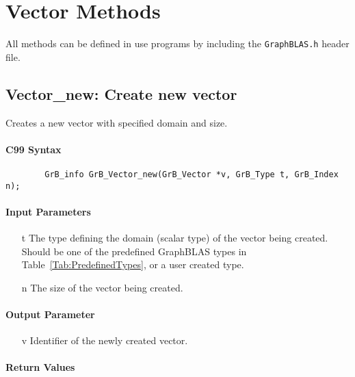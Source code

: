 \section{Vector Methods}

All methods can be defined in use programs by including the {\tt GraphBLAS.h} header file.

\subsection{{\sf Vector\_new}: Create new vector}

Creates a new vector with specified domain and size.

\paragraph{C99 Syntax}

\begin{verbatim}
        GrB_info GrB_Vector_new(GrB_Vector *v, GrB_Type t, GrB_Index n);
\end{verbatim}

\paragraph{Input Parameters}

\begin{itemize}[leftmargin=1.1in]
    \item[{\sf t}] The type defining the domain (scalar type) of the vector being created.
    Should be one of the predefined
    GraphBLAS types in Table~\ref{Tab:PredefinedTypes}, or a user created type.
    \item[{\sf n}] The size of the vector being created.
\end{itemize}

\paragraph{Output Parameter}

\begin{itemize}[leftmargin=1.1in]
    \item[{\sf v}] Identifier of the newly created vector.
\end{itemize}

\paragraph{Return Values}

